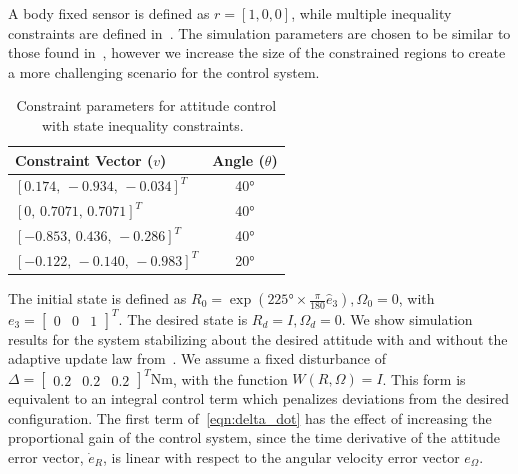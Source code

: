 A body fixed sensor is defined as \(r = [1,0,0]\), while multiple inequality constraints are defined in~.
The simulation parameters are chosen to be similar to those found in~\cite{lee2011b}, however we increase the size of the constrained regions to create a more challenging scenario for the control system.
\begin{table}[htbp]
    \centering
\begin{tabular}{lc}
    \toprule
Constraint Vector (\( v \)) & Angle (\( \theta \)) \\ 
\midrule
\([0.174,\,-0.934,\, -0.034]^T\) & \ang{40} \\ 
\([0 ,\, 0.7071 ,\, 0.7071]^T\) & \ang{40} \\ 
\([-0.853 ,\, 0.436 ,\, -0.286]^T\) & \ang{40} \\ 
\([-0.122 ,\,-0.140,\, -0.983]^T\) & \ang{20} \\
\bottomrule
\end{tabular} 
\caption{Constraint parameters for attitude control with state inequality constraints.~\label{tab:constraints}}
\end{table}
The initial state is defined as \(R_0 =  \exp(\ang{225} \times \frac{\pi}{180} \hat{e}_3), \Omega_0 = 0\), with \( e_3 = \begin{bmatrix} 0 & 0 & 1 \end{bmatrix}^T \).
The desired state is \( R_d = I,\Omega_d = 0\).
We show simulation results for the system stabilizing about the desired attitude with and without the adaptive update law from~.
We assume a fixed disturbance of \(\Delta = \begin{bmatrix} 0.2 & 0.2 & 0.2 \end{bmatrix}^T \si{\newton\meter}\), with the function \( W(R,\Omega) = I \).
This form is equivalent to an integral control term which penalizes deviations from the desired configuration.
The first term of~\cref{eqn:delta_dot} has the effect of increasing the proportional gain of the control system, since the time derivative of the attitude error vector, \( \dot{e}_{R} \), is linear with respect to the angular velocity error vector \( e_\Omega\).


